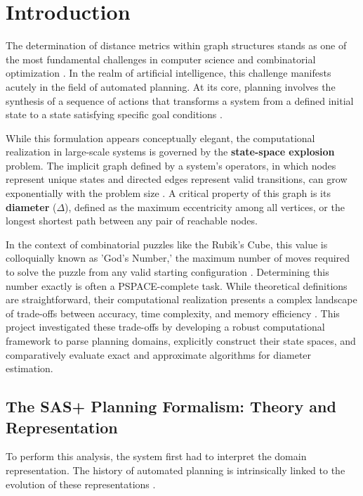 \chapter{Introduction}

The determination of distance metrics within graph structures stands as one of the most fundamental challenges in computer science and combinatorial optimization \cite{graphsurvey}. In the realm of artificial intelligence, this challenge manifests acutely in the field of automated planning. At its core, planning involves the synthesis of a sequence of actions that transforms a system from a defined initial state to a state satisfying specific goal conditions \cite{saarland}. 

While this formulation appears conceptually elegant, the computational realization in large-scale systems is governed by the \textbf{state-space explosion} problem. The implicit graph defined by a system's operators, in which nodes represent unique states and directed edges represent valid transitions, can grow exponentially with the problem size \cite{decoupled}. A critical property of this graph is its \textbf{diameter} ($\Delta$), defined as the maximum eccentricity among all vertices, or the longest shortest path between any pair of reachable nodes. 

In the context of combinatorial puzzles like the Rubik's Cube, this value is colloquially known as 'God's Number,' the maximum number of moves required to solve the puzzle from any valid starting configuration \cite{mathworld}. Determining this number exactly is often a PSPACE-complete task. While theoretical definitions are straightforward, their computational realization presents a complex landscape of trade-offs between accuracy, time complexity, and memory efficiency \cite{stanfordLec}. This project investigated these trade-offs by developing a robust computational framework to parse planning domains, explicitly construct their state spaces, and comparatively evaluate exact and approximate algorithms for diameter estimation.

\section{The SAS+ Planning Formalism: Theory and Representation}
To perform this analysis, the system first had to interpret the domain representation. The history of automated planning is intrinsically linked to the evolution of these representations \cite{saarland}.

